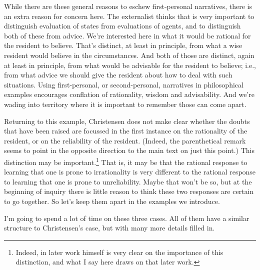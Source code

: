 While there are these general reasons to eschew first-personal narratives, there is an extra reason for concern here. The externalist thinks that is very important to distinguish evaluation of states from evaluations of agents, and to distinguish both of these from advice. We're interested here in what it would be rational for the resident to believe. That's distinct, at least in principle, from what a wise resident would believe in the circumstances. And both of those are distinct, again at least in principle, from what would be advisable for the resident to believe; i.e., from what advice we should give the resident about how to deal with such situations. Using first-personal, or second-personal, narratives in philosophical examples encourages conflation of rationality, wisdom and advisability. And we're wading into territory where it is important to remember those can come apart.

Returning to this example, Christensen does not make clear whether the doubts that have been raised are focussed in the first instance on the rationality of the resident, or on the reliability of the resident. (Indeed, the parenthetical remark seems to point in the opposite direction to the main text on just this point.) This distinction may be important.\footnote{Indeed, in later work \citet{Christensen2014} himself is very clear on the importance of this distinction, and what I say here draws on that later work.} That is, it may be that the rational response to learning that one is prone to irrationality is very different to the rational response to learning that one is prone to unreliability. Maybe that won't be so, but at the beginning of inquiry there is little reason to think these two responses are certain to go together. So let's keep them apart in the examples we introduce.

I'm going to spend a lot of time on these three cases. All of them have a similar structure to Christensen's case, but with many more details filled in.

